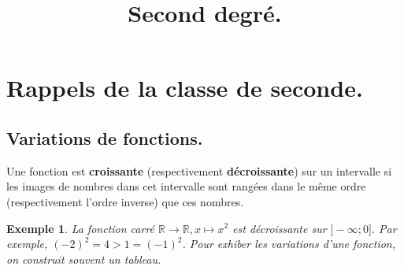 \documentclass{beamer}
\title{Second degré.}
\newtheorem{exemple}{Exemple}
\begin{document}
  
  \begin{frame}
    
    \titlepage
    
  \end{frame}
  
  \section{Rappels de la classe de seconde.}
    
  \subsection{Variations de fonctions.}
  \begin{frame} %
    
    
    
    \begin{definition} 
      Une fonction est \textbf{croissante} (respectivement \textbf{décroissante}) sur un
      intervalle si les images de nombres dans cet intervalle sont rangées dans le même
      ordre (respectivement l'ordre inverse) que ces nombres.
    \end{definition}
    
    {
      \begin{exemple}
      La fonction carré $\mathbb{R} \to \mathbb{R}, x \mapsto x^2$ est décroissante sur $]-\infty;0]$. 
      Par exemple, $(-2)^2=4>1=(-1)^2$. Pour exhiber les variations d'une fonction, 
      on construit souvent un tableau.
      \begin{center}
      \end{center}
      
    \end{exemple}
    }
  \end{frame}
  
\end{document}
